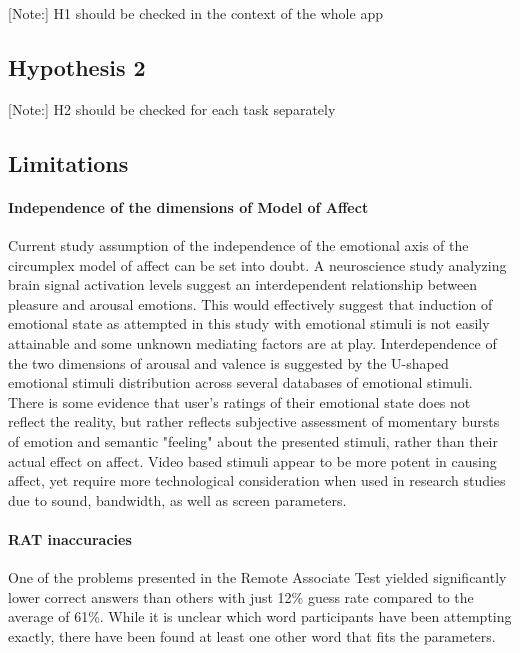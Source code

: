 	[Note:] H1 should be checked in the context of the whole app
	
	\subsection{Hypothesis 2}
	
	[Note:] H2 should be checked for each task separately
	
	\subsection{Limitations}
	
	\paragraph{Independence of the dimensions of Model of Affect}
	
	Current study assumption of the independence of the emotional axis of the circumplex model of affect can be set into doubt. A neuroscience study \cite{Bestelmeyer2017} analyzing brain signal activation levels suggest an interdependent relationship between pleasure and arousal emotions. 
	This would effectively suggest that induction of emotional state as attempted in this study with emotional stimuli is not easily attainable and some unknown mediating factors are at play. Interdependence of the two dimensions of arousal and valence is suggested by the U-shaped emotional stimuli distribution across several databases of emotional stimuli. There is some evidence that user's ratings of their emotional state does not reflect the reality, but rather reflects subjective assessment of momentary bursts of emotion and semantic "feeling" about the presented stimuli, rather than their actual effect on affect. Video based stimuli appear to be more potent in causing affect, yet require more technological consideration when used in research studies due to sound, bandwidth, as well as screen parameters.
	
	\paragraph{RAT inaccuracies}
	
	One of the problems presented in the Remote Associate Test yielded significantly lower correct answers than others with just 12\% guess rate compared to the average of 61\%. While it is unclear which word participants have been attempting exactly, there have been found at least one other word that fits the parameters.
	
